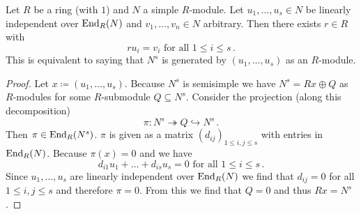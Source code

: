 \begin{theorem}
  Let $R$ be a ring (with $1$) and $N$ a simple $R$-module.
  Let $u_1, \dotsc, u_s \in N$ be linearly independent over $\operatorname{End}_R(N)$ and $v_1, \dotsc, v_n \in N$ arbitrary.
  Then there exists $r \in R$ with
  \[
      r u_i
    = v_i
    \text{ for all }
    1 \leq i \leq s \,.
  \]
  This is equivalent to saying that $N^s$ is generated by $(u_1, \dotsc, u_s)$ as an $R$-module.
\end{theorem}


\begin{proof}
  Let $x \coloneqq (u_1, \dotsc, u_s)$.
  Because $N^s$ is semisimple we have $N^s = Rx \oplus Q$ as $R$-modules for some $R$-submodule $Q \subseteq N^s$.
  Consider the projection (along this decomposition)
  \[
                        \pi
    \colon              N^s
    \twoheadrightarrow  Q
    \hookrightarrow     N^s \,.
  \]
  Then $\pi \in \operatorname{End}_R(N^s)$.
  $\pi$ is given as a matrix $(d_{ij})_{1 \leq i,j \leq s}$ with entries in $\operatorname{End}_R(N)$.
  Because $\pi(x) = 0$ and we have
  \[
      d_{i1} u_1 + \dotsc + d_{is} u_s
    = 0
    \text{ for all }
    1 \leq i \leq s \,.
  \]
  Since $u_1, \dotsc, u_s$ are linearly independent over $\operatorname{End}_R(N)$ we find that $d_{ij} = 0$ for all $1 \leq i,j \leq s$ and therefore $\pi = 0$.
  From this we find that $Q = 0$ and thus $Rx = N^s$.
\end{proof}


% 
% 

